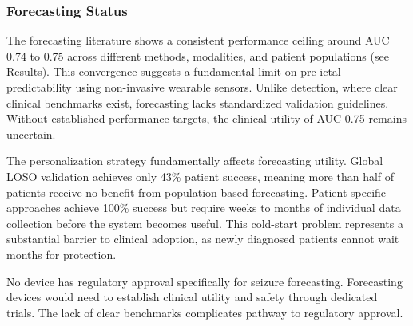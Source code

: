 \subsubsection{Forecasting Status}

The forecasting literature shows a consistent performance ceiling around AUC 0.74 to 0.75 across different methods, modalities, and patient populations (see Results). This convergence suggests a fundamental limit on pre-ictal predictability using non-invasive wearable sensors. Unlike detection, where clear clinical benchmarks exist, forecasting lacks standardized validation guidelines. Without established performance targets, the clinical utility of AUC 0.75 remains uncertain.

The personalization strategy fundamentally affects forecasting utility. Global LOSO validation achieves only 43\% patient success, meaning more than half of patients receive no benefit from population-based forecasting. Patient-specific approaches achieve 100\% success but require weeks to months of individual data collection before the system becomes useful. This cold-start problem represents a substantial barrier to clinical adoption, as newly diagnosed patients cannot wait months for protection.

No device has regulatory approval specifically for seizure forecasting. Forecasting devices would need to establish clinical utility and safety through dedicated trials. The lack of clear benchmarks complicates pathway to regulatory approval.
